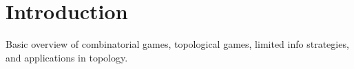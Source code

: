 
\chapter{Introduction}

Basic overview of combinatorial games, topological games, limited info strategies,
and applications in topology.



